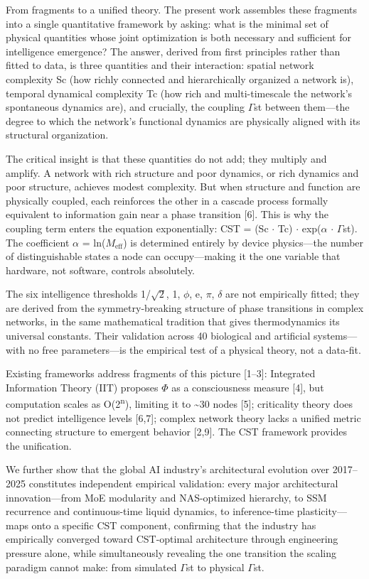 \documentclass[a4paper,12pt]{article}
\begin{document}
From fragments to a unified theory.
The present work assembles these fragments into a single quantitative framework by asking: what is the minimal set of physical quantities whose joint optimization is both necessary and sufficient for intelligence emergence?
The answer, derived from first principles rather than fitted to data, is three quantities and their interaction: spatial network complexity Sc (how richly connected and hierarchically organized a network is), temporal dynamical complexity Tc (how rich and multi-timescale the network's spontaneous dynamics are), and crucially, the coupling $\Gamma$st between them---the degree to which the network's functional dynamics are physically aligned with its structural organization.


The critical insight is that these quantities do not add; they multiply and amplify.
A network with rich structure and poor dynamics, or rich dynamics and poor structure, achieves modest complexity.
But when structure and function are physically coupled, each reinforces the other in a cascade process formally equivalent to information gain near a phase transition [6].
This is why the coupling term enters the equation exponentially: CST = (Sc $\cdot$ Tc) $\cdot$ exp($\alpha$ $\cdot$ $\Gamma$st).
The coefficient $\alpha$ = ln($M_{\text{eff}}$) is determined entirely by device physics---the number of distinguishable states a node can occupy---making it the one variable that hardware, not software, controls absolutely.


The six intelligence thresholds {1/$\sqrt{2}$, 1, $\phi$, e, $\pi$, $\delta$} are not empirically fitted; they are derived from the symmetry-breaking structure of phase transitions in complex networks, in the same mathematical tradition that gives thermodynamics its universal constants. Their validation across 40 biological and artificial systems---with no free parameters---is the empirical test of a physical theory, not a data-fit.


Existing frameworks address fragments of this picture [1--3]: Integrated Information Theory (IIT) proposes $\Phi$ as a consciousness measure [4], but computation scales as O(2\textsuperscript{n}), limiting it to \textasciitilde{}30 nodes [5]; criticality theory does not predict intelligence levels [6,7]; complex network theory lacks a unified metric connecting structure to emergent behavior [2,9]. The CST framework provides the unification.


We further show that the global AI industry's architectural evolution over 2017--2025 constitutes independent empirical validation: every major architectural innovation---from MoE modularity and NAS-optimized hierarchy, to SSM recurrence and continuous-time liquid dynamics, to inference-time plasticity---maps onto a specific CST component, confirming that the industry has empirically converged
toward CST-optimal architecture through engineering pressure alone, while simultaneously revealing the one transition the scaling paradigm cannot make: from simulated $\Gamma$st to physical $\Gamma$st.
\end{document}
